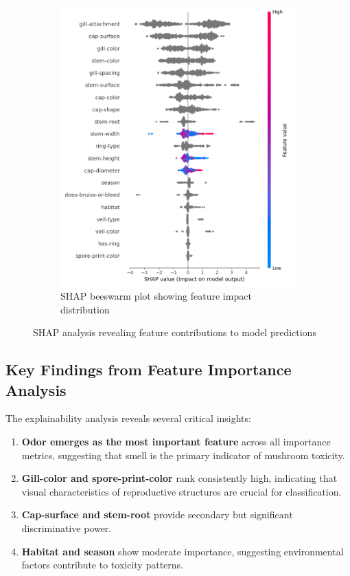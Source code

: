 \documentclass[11pt,a4paper]{article}
\begin{document}
\begin{figure}[H]
\begin{subfigure}{0.48\textwidth}
        \includegraphics[width=\textwidth]{figures/shap_beeswarm.png}
        \caption{SHAP beeswarm plot showing feature impact distribution}
    \end{subfigure}
    \caption{SHAP analysis revealing feature contributions to model predictions}
    \label{fig:shap_analysis}
\end{figure}

\subsection{Key Findings from Feature Importance Analysis}

The explainability analysis reveals several critical insights:

\begin{enumerate}
    \item \textbf{Odor emerges as the most important feature} across all importance metrics, suggesting that smell is the primary indicator of mushroom toxicity.
    \item \textbf{Gill-color and spore-print-color} rank consistently high, indicating that visual characteristics of reproductive structures are crucial for classification.
    \item \textbf{Cap-surface and stem-root} provide secondary but significant discriminative power.
    \item \textbf{Habitat and season} show moderate importance, suggesting environmental factors contribute to toxicity patterns.
\end{enumerate}
\end{document}
